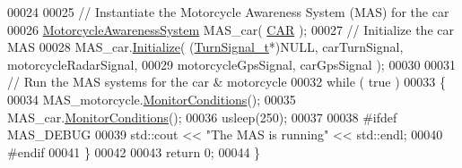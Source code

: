 \begin{DoxyCode}
00024 
00025     \textcolor{comment}{// Instantiate the Motorcycle Awareness System (MAS) for the car}
00026     \hyperlink{classMotorcycleAwarenessSystem}{MotorcycleAwarenessSystem} MAS\_car( \hyperlink{MotorcycleAwarenessSystemTypes_8hpp_a0c05c42b98a847f971385c81c2a81afaa5fc54ebcb1dd4bf1e1b93cbc77b57b40}{CAR} );
00027     \textcolor{comment}{// Initialize the car MAS}
00028     MAS\_car.\hyperlink{classMotorcycleAwarenessSystem_a826b6c2286c494c8aca3a47e6430b3ff}{Initialize}( (\hyperlink{structTurnSignal__t}{TurnSignal\_t}*)NULL, carTurnSignal, motorcycleRadarSignal,
00029                                           motorcycleGpsSignal, carGpsSignal );
00030 
00031     \textcolor{comment}{// Run the MAS systems for the car & motorcycle}
00032     \textcolor{keywordflow}{while} ( \textcolor{keyword}{true} )
00033     \{
00034         MAS\_motorcycle.\hyperlink{classMotorcycleAwarenessSystem_afb19e832c17d43941d9ed6c4f4435a2e}{MonitorConditions}();
00035         MAS\_car.\hyperlink{classMotorcycleAwarenessSystem_afb19e832c17d43941d9ed6c4f4435a2e}{MonitorConditions}();
00036         usleep(250);
00037 
00038 \textcolor{preprocessor}{#ifdef MAS\_DEBUG}
00039 \textcolor{preprocessor}{}        std::cout << \textcolor{stringliteral}{"The MAS is running"} << std::endl;
00040 \textcolor{preprocessor}{#endif}
00041 \textcolor{preprocessor}{}    \}
00042 
00043     \textcolor{keywordflow}{return} 0;
00044 \}
\end{DoxyCode}
